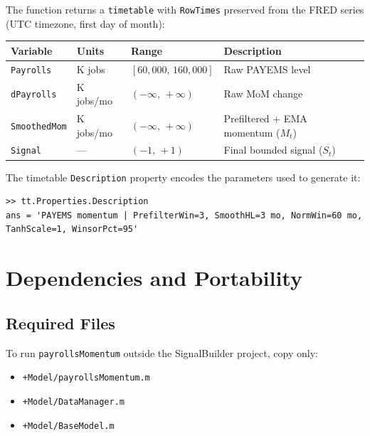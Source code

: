 \documentclass[11pt, a4paper]{article}
\begin{document}
The function returns a \texttt{timetable} with \texttt{RowTimes}
preserved from the FRED series (UTC timezone, first day of month):

\begin{center}
\renewcommand{\arraystretch}{1.3}
\begin{tabular}{llll}
\toprule
\textbf{Variable} & \textbf{Units} & \textbf{Range} & \textbf{Description} \\
\midrule
\texttt{Payrolls}   & K jobs     & $[60{,}000,\,160{,}000]$ & Raw PAYEMS level \\
\texttt{dPayrolls}  & K jobs/mo  & $(-\infty,\,+\infty)$     & Raw MoM change \\
\texttt{SmoothedMom}& K jobs/mo  & $(-\infty,\,+\infty)$     & Prefiltered + EMA momentum ($M_t$) \\
\texttt{Signal}     & —          & $(-1,\,+1)$               & Final bounded signal ($S_t$) \\
\bottomrule
\end{tabular}
\end{center}

The timetable \texttt{Description} property encodes the parameters
used to generate it:
\begin{lstlisting}[style=matlab, numbers=none]
>> tt.Properties.Description
ans = 'PAYEMS momentum | PrefilterWin=3, SmoothHL=3 mo, NormWin=60 mo, TanhScale=1, WinsorPct=95'
\end{lstlisting}

\section{Dependencies and Portability}
\label{sec:deps}

\subsection{Required Files}
To run \texttt{payrollsMomentum} outside the SignalBuilder project,
copy only:
\begin{itemize}[leftmargin=2em]
  \item \texttt{+Model/payrollsMomentum.m}
  \item \texttt{+Model/DataManager.m}
  \item \texttt{+Model/BaseModel.m}
\end{itemize}
\end{document}
